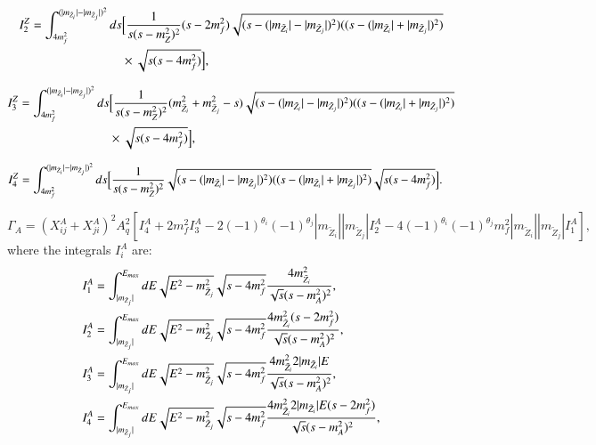 \documentclass[final,3p,times,pdflatex]{elsarticle}
\begin{document}
\begin{equation}
\begin{aligned}
I_{2}^Z = \int_{4m_{f}^2}^{(|m_{\tilde{Z}_i}| - |m_{\tilde{Z}_j}|)^2} ds & \Big[{1 \over s (s-m_{Z}^2)^2}(s-2 m_{f}^2) \sqrt{(s-(|m_{\tilde{Z}_i}|-|m_{\tilde{Z}_j}|)^2)((s-(|m_{\tilde{Z}_i}|+|m_{\tilde{Z}_j}|)^2)} \\ & \times \sqrt{s(s-4m_{f}^2)}\Big],
\end{aligned}
\end{equation}

\begin{equation}
\begin{aligned}
I_{3}^Z = \int_{4m_{f}^2}^{(|m_{\tilde{Z}_i}| - |m_{\tilde{Z}_j}|)^2} ds & \Big[{1 \over s (s-m_{Z}^2)^2}(m_{\tilde{Z}_i}^2 + m_{\tilde{Z}_j}^2 - s) \sqrt{(s-(|m_{\tilde{Z}_i}|-|m_{\tilde{Z}_j}|)^2)((s-(|m_{\tilde{Z}_i}|+|m_{\tilde{Z}_j}|)^2)} \\ & \times \sqrt{s(s-4m_{f}^2)}\Big],
\end{aligned}
\end{equation}

\begin{equation}
\begin{aligned}
I_{4}^Z = \int_{4m_{f}^2}^{(|m_{\tilde{Z}_i}| - |m_{\tilde{Z}_j}|)^2} ds & \Big[{1 \over s (s-m_{Z}^2)^2}\sqrt{(s-(|m_{\tilde{Z}_i}|-|m_{\tilde{Z}_j}|)^2)((s-(|m_{\tilde{Z}_i}|+|m_{\tilde{Z}_j}|)^2)}\sqrt{s(s-4m_{f}^2)}\Big].
\end{aligned}
\end{equation}

\begin{equation}
\Gamma_A = (X_{ij}^A + X_{ji}^A)^2 A_{q}^2 \left[I_{4}^A + 2m_{f}^2 I_{3}^A - 2(-1)^{\theta_i}(-1)^{\theta_j}|m_{\tilde{Z}_i}||m_{\tilde{Z}_j}|I_{2}^A - 4(-1)^{\theta_i}(-1)^{\theta_j}m_{f}^2|m_{\tilde{Z}_i}||m_{\tilde{Z}_j}|I_{1}^A \right],
\end{equation}
where the integrals $I_{i}^A$ are:
\begin{align}
I_{1}^A &= \int_{|m_{\tilde{Z}_j}|}^{E_{max}} dE \sqrt{E^2 - m_{\tilde{Z}_j}^2} \sqrt{s - 4m_{f}^2} {4 m_{\tilde{Z}_i}^2 \over \sqrt{s}(s-m_{A}^2)^2}, \\
I_{2}^A &= \int_{|m_{\tilde{Z}_j}|}^{E_{max}} dE \sqrt{E^2 - m_{\tilde{Z}_j}^2} \sqrt{s - 4m_{f}^2} {4 m_{\tilde{Z}_i}^2 (s-2m_{f}^2) \over \sqrt{s}(s-m_{A}^2)^2}, \\
I_{3}^A &= \int_{|m_{\tilde{Z}_j}|}^{E_{max}} dE \sqrt{E^2 - m_{\tilde{Z}_j}^2} \sqrt{s - 4m_{f}^2} {4 m_{\tilde{Z}_i}^2 2|m_{\tilde{Z}_i}|E \over \sqrt{s}(s-m_{A}^2)^2}, \\
I_{4}^A &= \int_{|m_{\tilde{Z}_j}|}^{E_{max}} dE \sqrt{E^2 - m_{\tilde{Z}_j}^2} \sqrt{s - 4m_{f}^2} {4 m_{\tilde{Z}_i}^2 2|m_{\tilde{Z}_i}|E (s-2m_{f}^2) \over \sqrt{s}(s-m_{A}^2)^2},
\end{align}
\end{document}
